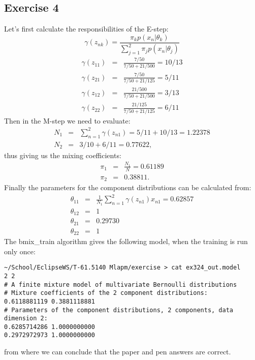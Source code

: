 \documentclass[a4paper,oneside,article]{memoir}
\begin{document}
\subsection*{Exercise 4}
Let's first calculate the responsibilities of the E-step:
\begin{equation}
\gamma(z_{nk}) = \frac{\pi_k p(x_n|\theta_k)}{\sum\limits_{j=1}^{2}\pi_j p(x_n|\theta_j)}
\end{equation}
\begin{eqnarray*}
\gamma(z_{11}) &=& \frac{7/50}{7/50 + 21/500} = 10/13 \\
\gamma(z_{21}) &=& \frac{7/50}{7/50 + 21/125} = 5/11 \\
\gamma(z_{12}) &=& \frac{21/500}{7/50 + 21/500} = 3/13 \\
\gamma(z_{22}) &=& \frac{21/125}{7/50 + 21/125} = 6/11
\end{eqnarray*}
Then in the M-step we need to evaluate:
\begin{eqnarray*}
N_1 &=& \sum\limits_{n=1}^{2}\gamma(z_{n1}) = 5/11 + 10/13 = 1.22378 \\
N_2 &=& 3/10 + 6/11 = 0.77622\textrm{,}
\end{eqnarray*}
thus giving us the mixing coefficients:
\begin{eqnarray*}
\pi_1 &=& \frac{N_1}{N} = 0.61189 \\
\pi_2 &=& 0.38811\textrm{.}
\end{eqnarray*}
Finally the parameters for the component distributions can be calculated from:
\begin{eqnarray*}
\theta_{11} &=& \frac{1}{N_1}\sum\limits_{n=1}^{2}\gamma(z_{n1})x_{n1} = 0.62857 \\
\theta_{12} &=& 1 \\
\theta_{21} &=& 0.29730\\
\theta_{22} &=& 1
\end{eqnarray*}
The bmix\_train algorithm gives the following model, when the training is run only once:
\begin{lstlisting}
~/School/EclipseWS/T-61.5140 Mlapm/exercise > cat ex324_out.model 
2 2
# A finite mixture model of multivariate Bernoulli distributions
# Mixture coefficients of the 2 component distributions:
0.6118881119 0.3881118881 
# Parameters of the component distributions, 2 components, data dimension 2:
0.6285714286 1.0000000000 
0.2972972973 1.0000000000 
\end{lstlisting}
from where we can conclude that the paper and pen answers are correct.
\end{document}
